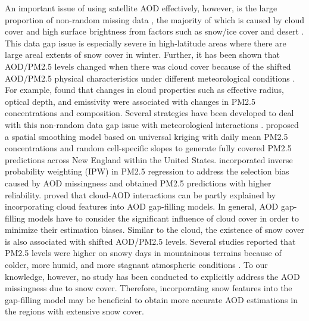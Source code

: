 \documentclass[11pt]{article}
\begin{document}
An important issue of using satellite AOD effectively, however, is the large proportion of non-random missing data \citep{Kloog2012, Xiao2016, Xiao2017}, the majority of which is caused by cloud cover and high surface brightness from factors such as snow/ice cover and desert \citep{Chu2002}. This data gap issue is especially severe in high-latitude areas where there are large areal extents of snow cover in winter. Further, it has been shown that AOD/PM2.5 levels changed when there was cloud cover because of the shifted AOD/PM2.5 physical characteristics under different meteorological conditions \citep{Myhre2007, Alam2014, Kang2015, Yu2015, Belle2017}. For example, \citet{Belle2017} found that changes in cloud properties such as effective radius, optical depth, and emissivity were associated with changes in PM2.5 concentrations and composition. Several strategies have been developed to deal with this non-random data gap issue with meteorological interactions \citep{Donkelaar2011, Kloog2011, Kloog2012, Li2012, Xiao2017}. \citet{Kloog2011} proposed a spatial smoothing model based on universal kriging with daily mean PM2.5 concentrations and random cell-specific slopes to generate fully covered PM2.5 predictions across New England within the United States. \citet{Kloog2012} incorporated inverse probability weighting (IPW) in PM2.5 regression to address the selection bias caused by AOD missingness and obtained PM2.5 predictions with higher reliability. \citet{Xiao2017} proved that cloud-AOD interactions can be partly explained by incorporating cloud features into AOD gap-filling models. In general, AOD gap-filling models have to consider the significant influence of cloud cover in order to minimize their estimation biases. Similar to the cloud, the existence of snow cover is also associated with shifted AOD/PM2.5 levels. Several studies reported that PM2.5 levels were higher on snowy days in mountainous terrains because of colder, more humid, and more stagnant atmospheric conditions \citep{Chen2012, Whiteman2014, Green2015}. To our knowledge, however, no study has been conducted to explicitly address the AOD missingness due to snow cover. Therefore, incorporating snow features into the gap-filling model may be beneficial to obtain more accurate AOD estimations in the regions with extensive snow cover.
\end{document}

